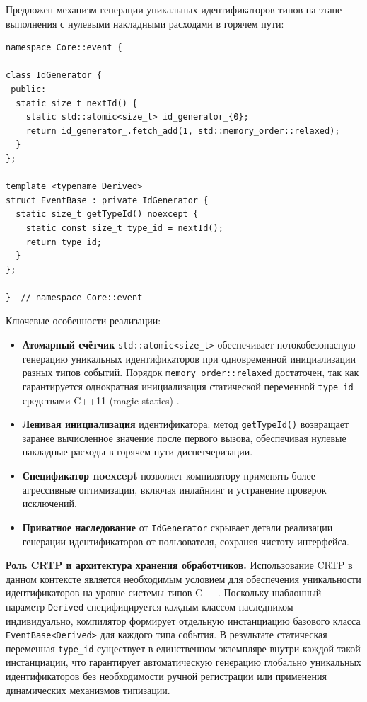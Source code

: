Предложен механизм генерации уникальных идентификаторов типов на этапе выполнения с нулевыми накладными расходами в горячем пути:

\begin{lstlisting}[caption={Реализация EventBase с CRTP и атомарным генератором идентификаторов},label=lst:eventbase_impl]
namespace Core::event {

class IdGenerator {
 public:
  static size_t nextId() {
    static std::atomic<size_t> id_generator_{0};
    return id_generator_.fetch_add(1, std::memory_order::relaxed);
  }
};

template <typename Derived>
struct EventBase : private IdGenerator {
  static size_t getTypeId() noexcept {
    static const size_t type_id = nextId();
    return type_id;
  }
};

}  // namespace Core::event
\end{lstlisting}

Ключевые особенности реализации:

\begin{itemize}
    \item \textbf{Атомарный счётчик} \texttt{std::atomic<size\_t>} обеспечивает потокобезопасную генерацию уникальных идентификаторов при одновременной инициализации разных типов событий.
    Порядок \texttt{memory\_order::relaxed} достаточен, так как гарантируется однократная инициализация статической переменной \texttt{type\_id} средствами C++11 (magic statics) \cite{iso2011cpp}.

    \item \textbf{Ленивая инициализация} идентификатора: метод \texttt{getTypeId()} возвращает заранее вычисленное значение после первого вызова, обеспечивая нулевые накладные расходы в горячем пути диспетчеризации.

    \item \textbf{Спецификатор noexcept} позволяет компилятору применять более агрессивные оптимизации, включая инлайнинг и устранение проверок исключений.

    \item \textbf{Приватное наследование} от \texttt{IdGenerator} скрывает детали реализации генерации идентификаторов от пользователя, сохраняя чистоту интерфейса.
\end{itemize}

\textbf{Роль CRTP и архитектура хранения обработчиков.} Использование CRTP в данном контексте является необходимым условием для обеспечения уникальности идентификаторов на уровне системы типов C++. Поскольку шаблонный параметр \texttt{Derived} специфицируется каждым классом-наследником индивидуально, компилятор формирует отдельную инстанциацию базового класса \texttt{EventBase<Derived>} для каждого типа события. В результате статическая переменная \texttt{type\_id} существует в единственном экземпляре внутри каждой такой инстанциации, что гарантирует автоматическую генерацию глобально уникальных идентификаторов без необходимости ручной регистрации или применения динамических механизмов типизации.

